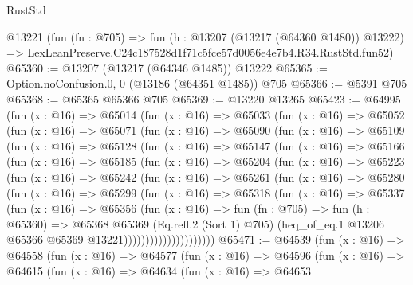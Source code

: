 \begin{lexlean}{RustStd}
\begin{coremodule}
    @13221
    (fun (fn : @705) =>
    fun (h : @13207 (@13217 (@64360 @1480)) @13222) =>
    LexLeanPreserve.C24c187528d1f71c5fce57d0056e4e7b4.R34.RustStd.fun52)
@65360 := @13207 (@13217 (@64346 @1485)) @13222
@65365 := Option.noConfusion.{0, 0} (@13186 (@64351 @1485)) @705
@65366 := @5391 @705
@65368 := @65365 @65366 @705
@65369 := @13220 @13265
@65423 := @64995
    (fun (x : @16) =>
    @65014
      (fun (x : @16) =>
      @65033
        (fun (x : @16) =>
        @65052
          (fun (x : @16) =>
          @65071
            (fun (x : @16) =>
            @65090
              (fun (x : @16) =>
              @65109
                (fun (x : @16) =>
                @65128
                  (fun (x : @16) =>
                  @65147
                    (fun (x : @16) =>
                    @65166
                      (fun (x : @16) =>
                      @65185
                        (fun (x : @16) =>
                        @65204
                          (fun (x : @16) =>
                          @65223
                            (fun (x : @16) =>
                            @65242
                              (fun (x : @16) =>
                              @65261
                                (fun (x : @16) =>
                                @65280
                                  (fun (x : @16) =>
                                  @65299
                                    (fun (x : @16) =>
                                    @65318
                                      (fun (x : @16) =>
                                      @65337
                                        (fun (x : @16) =>
                                        @65356
                                          (fun (x : @16) =>
                                          fun (fn : @705) =>
                                          fun (h : @65360) =>
                                          @65368
                                            @65369
                                            (Eq.refl.{2} (Sort 1) @705)
                                            (heq_of_eq.{1}
                                              @13206
                                              @65366
                                              @65369
                                              @13221)))))))))))))))))))))
@65471 := @64539
    (fun (x : @16) =>
    @64558
      (fun (x : @16) =>
      @64577
        (fun (x : @16) =>
        @64596
          (fun (x : @16) =>
          @64615
            (fun (x : @16) =>
            @64634
              (fun (x : @16) =>
              @64653

\end{coremodule}
\end{lexlean}
